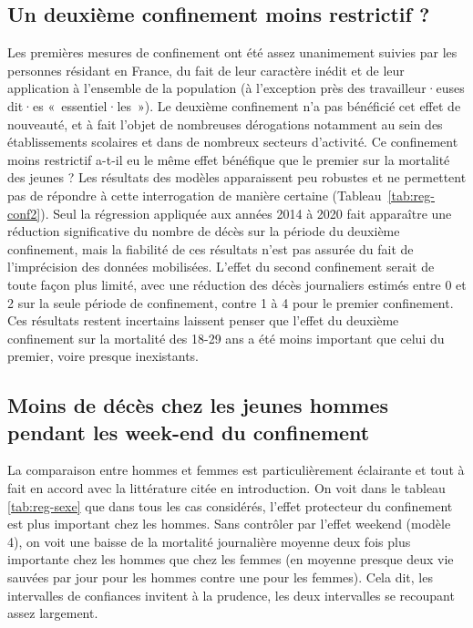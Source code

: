\documentclass[titlepage]{article}
\begin{document}
\subsection*{Un deuxième confinement moins restrictif ?}

Les premières mesures de confinement ont été assez unanimement suivies par les personnes résidant en France, du fait de leur caractère inédit et de leur application à l'ensemble de la population (à l'exception près des travailleur·euses dit·es « essentiel·les »). Le deuxième confinement n'a pas bénéficié cet effet de nouveauté, et à fait l'objet de nombreuses dérogations notamment au sein des établissements scolaires et dans de nombreux secteurs d'activité. Ce confinement moins restrictif a-t-il eu le même effet bénéfique que le premier sur la mortalité des jeunes ? Les résultats des modèles apparaissent peu robustes et ne permettent pas de répondre à cette interrogation de manière certaine (Tableau \ref{tab:reg-conf2}). Seul la régression appliquée aux années 2014 à 2020 fait apparaître une réduction significative du nombre de décès sur la période du deuxième confinement, mais la fiabilité de ces résultats n'est pas assurée du fait de l'imprécision des données mobilisées. L'effet du second confinement serait de toute façon plus limité, avec une réduction des décès journaliers estimés entre  0 et 2 sur la seule période de confinement, contre 1 à 4 pour le premier confinement. Ces résultats restent incertains laissent penser que l'effet du deuxième confinement sur la mortalité des 18-29 ans a été moins important que celui du premier, voire presque inexistants. 


\subsection*{Moins de décès chez les jeunes hommes pendant les week-end du confinement}

La comparaison entre hommes et femmes est particulièrement éclairante et tout à fait en accord avec la littérature citée en introduction. On voit dans le tableau \ref{tab:reg-sexe} que dans tous les cas considérés, l'effet protecteur du confinement est plus important chez les hommes. Sans contrôler par l'effet weekend (modèle 4), on voit une baisse de la mortalité journalière moyenne deux fois plus importante chez les hommes que chez les femmes (en moyenne presque deux vie sauvées par jour pour les hommes contre une pour les femmes). Cela dit, les intervalles de confiances invitent à la prudence, les deux intervalles se recoupant assez largement. \\
\end{document}
